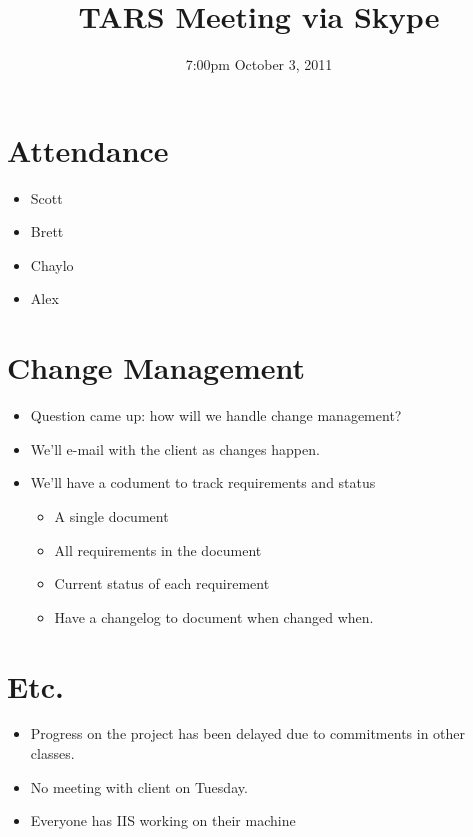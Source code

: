 \documentclass{article}
\begin{document}
\title{TARS Meeting via Skype}
\date{7:00pm October 3, 2011}
\maketitle

\section{Attendance}
\begin{itemize}
\item Scott
\item Brett
\item Chaylo
\item Alex
\end{itemize}

\section{Change Management}
\begin{itemize}
\item Question came up: how will we handle change management?
\item We'll e-mail with the client as changes happen.
\item We'll have a codument to track requirements and status
	\begin{itemize}
	\item A single document
	\item All requirements in the document
	\item Current status of each requirement
	\item Have a changelog to document when changed when.
	\end{itemize}
\end{itemize}

\section{Etc.}
\begin{itemize}
\item Progress on the project has been delayed due to commitments in other classes.
\item No meeting with client on Tuesday.
\item Everyone has IIS working on their machine
\end{itemize}
\end{document}
